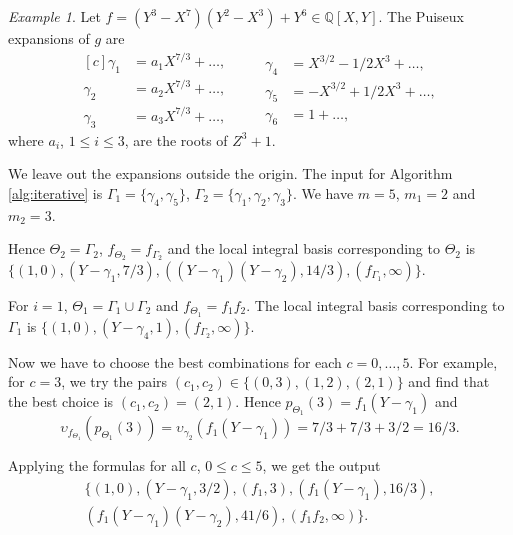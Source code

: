 \documentclass[a4paper,11pt]{amsart}%
\theoremstyle{definition}
\theoremstyle{plain}
\theoremstyle{remark}
\newtheorem{example}[defn]{Example}
\begin{document}
\begin{example}
Let $f = (Y^{3} - X^{7})(Y^{2} - X^{3})+Y^{6} \in{\mathbb{Q}}[X,Y]$.
The Puiseux expansions of $g$ are
\begin{equation*}
\begin{aligned}[c]
\gamma_1 &= a_1 X^{7/3} +\dots, \\
\gamma_2 &= a_2 X^{7/3} +  \dots, \\
\gamma_3 &= a_3 X^{7/3} + \dots,
\end{aligned}
\quad\quad
\begin{aligned}
\gamma_4 &=  X^{3/2} -1/2X^{3} + \dots, \\
\gamma_5 &= -X^{3/2} +1/2X^{3}  + \dots,  \\
\gamma_6 &= 1 + \dots,
\end{aligned}
\end{equation*}
where $a_{i}$, $1 \le i \le 3$, are the roots of $Z^{3}+1$.

We leave out the expansions outside the origin. The input for Algorithm \ref{alg:iterative} is $\Gamma_1 = \{\gamma_4, \gamma_5\}$, $\Gamma_2 = \{\gamma_1, \gamma_2, \gamma_3\}$.
We have $m=5$, $m_{1} = 2$ and $m_{2} = 3$.

Hence $\Theta_{2} = \Gamma_{2}$, $f_{\Theta_{2}} = f_{\Gamma_{2}}$ and
the local integral basis corresponding to $\Theta_{2}$ is $\{(1, 0), (Y - \gamma_1, 7/3),
((Y - \gamma_1)(Y - \gamma_2), 14/3), (f_{\Gamma_1}, \infty)\}$.

For $i = 1$, $\Theta_{1} = \Gamma_1 \cup \Gamma_2$ and $f_{\Theta_{1}} = f_{1}f_{2}$. The
local integral basis corresponding to $\Gamma_{1}$ is $\{(1, 0), (Y - \gamma_4,
1), (f_{\Gamma_2}, \infty)\}$.

Now we have to choose the best combinations for each $c = 0, \dots, 5$. For
example, for $c = 3$, we try the pairs $(c_{1}, c_{2}) \in\{(0, 3), (1,2), (2,1)\}$ and find that the best choice is $(c_{1}, c_{2}) = (2,1)$. Hence $p_{\Theta_1}(3) =  f_{1} (Y - \gamma_1)$ and
$$\upsilon_{f_{\Theta_{1}}}(p_{\Theta_1}(3)) = \upsilon_{\gamma_2}(f_{1} (Y - \gamma_1)) = 7/3 + 7/3 + 3/2 = 16/3.$$

Applying the formulas for all $c$, $0 \leq c \leq5$, we get the output
\begin{multline*}
\{(1, 0), (Y - \gamma_1, 3/2), (f_{1}, 3), (f_{1} (Y - \gamma_1), 16/3), \\
(f_{1} (Y - \gamma_1)(Y - \gamma_2), 41/6), (f_{1}f_{2}, \infty)\}.
\end{multline*}


\end{example}
\end{document}
